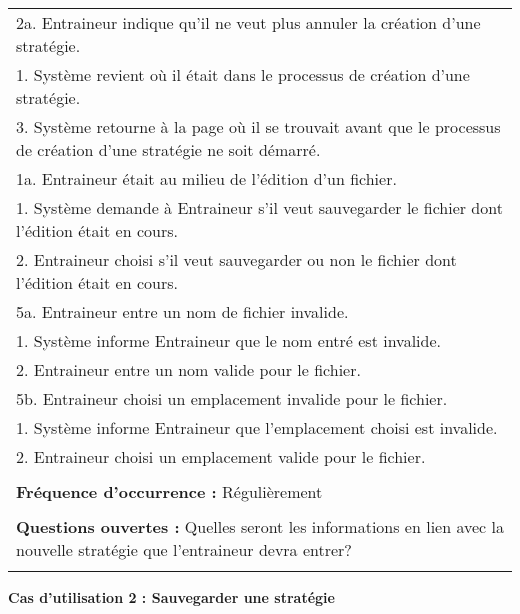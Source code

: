 \begin{tabular}{|p{16cm}|}
	\hspace{2cm}2a. Entraineur indique qu'il ne veut plus annuler la création d'une stratégie.\\
	\hspace{3cm}1. Système revient où il était dans le processus de création d'une stratégie.\\
	\hspace{1cm}3. Système retourne à la page où il se trouvait avant que le processus de création d'une stratégie ne soit démarré.\\
	1a. Entraineur était au milieu de l'édition d'un fichier.\\
	\hspace{1cm}1. Système demande à Entraineur s'il veut sauvegarder le fichier dont l'édition était en cours.\\
	\hspace{1cm}2. Entraineur choisi s'il veut sauvegarder ou non le fichier dont l'édition était en cours.\\
	5a. Entraineur entre un nom de fichier invalide.\\
	\hspace{1cm}1. Système informe Entraineur que le nom entré est invalide.\\
	\hspace{1cm}2. Entraineur entre un nom valide pour le fichier.\\
	5b. Entraineur choisi un emplacement invalide pour le fichier.\\
	\hspace{1cm}1. Système informe Entraineur que l'emplacement choisi est invalide.\\
	\hspace{1cm}2. Entraineur choisi un emplacement valide pour le fichier.\\
	\\
	\textbf{Fréquence d'occurrence :} Régulièrement\\
	\\
	\textbf{Questions ouvertes :} Quelles seront les informations en lien avec la nouvelle stratégie que l'entraineur devra entrer?\\
	\\
	\hline
\end{tabular}
\newpage
\begin{flushleft}
	\textbf{Cas d'utilisation 2 : Sauvegarder une stratégie}\\
\end{flushleft}
